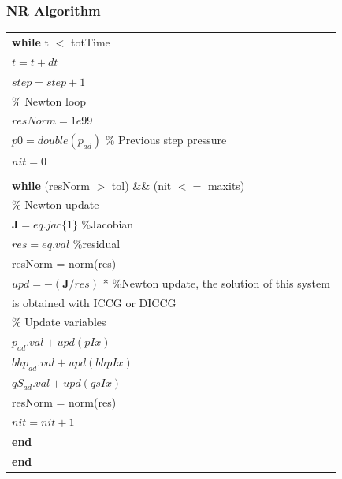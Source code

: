 \documentclass{beamer}
\begin{document}
\begin{frame}[shrink=35]
\frametitle{NR Algorithm}
\begin{tabular}[!ht]{|l|}
\hline
\hspace{0.5cm}\textbf{while} t $<$ totTime\\
 \hspace{1cm} $t = t + dt$\\ 
 \hspace{1cm}$step = step + 1$\\
  \hspace{1cm}\% Newton loop \\
 \hspace{1cm} $resNorm = 1e99$\\
 \hspace{1cm} $p0 = double(p_{ad})$ \hspace{2cm}\% Previous step pressure\\
 \hspace{1cm} $nit = 0$\\ \\
 \hspace{1cm} \textbf{while} (resNorm $>$ tol) \&\& (nit $<=$ maxits)\\
 \hspace{1.5cm}  \% Newton update\\
 \hspace{2cm}  $\mathbf{J}=eq.jac\{1\}$ \hspace{1.5cm}  \%Jacobian\\
\hspace{2cm}$res=eq.val$  \hspace{2cm} \%residual\\
\hspace{2cm} {\color{blue} resNorm = norm(res)}\\
\hspace{2cm}$upd=-(\mathbf{J}/res)$ {*}   
\hspace{1.5cm}\%Newton update, the solution of this system\\
\hspace{7cm}is obtained with ICCG or DICCG\\
  \hspace{1.5cm}  \% Update variables\\
\hspace{2cm}$p_{ad}.val+upd(pIx)$ \\
\hspace{2cm}$bhp_{ad}.val+upd(bhpIx)$  \\
\hspace{2cm}$qS_{ad}.val+upd(qsIx)$   \\
\hspace{2cm} resNorm = norm(res) \\
  \hspace{1.5cm}  $nit= nit + 1$\\
\hspace{1cm} \textbf{end}\\
\hspace{0.5cm}\textbf{end}\\
\hline
\end{tabular}
\end{frame}
\end{document}

